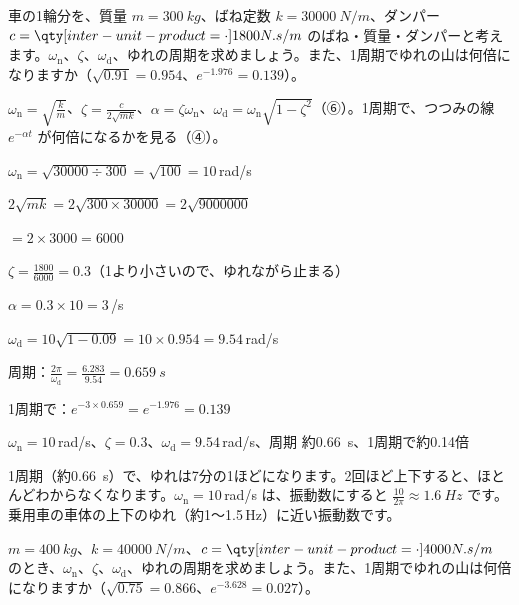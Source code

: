 \begin{reidai}[車の1輪分のゆれ]
車の1輪分を、質量 $m=\qty{300}{kg}$、ばね定数 $k=\qty{30000}{N/m}$、ダンパー $c=\bkvimNsm{1800}$ のばね・質量・ダンパーと考えます。$\omega_{\mathrm n}$、$\zeta$、$\omega_{\mathrm d}$、ゆれの周期を求めましょう。また、1周期でゆれの山は何倍になりますか（$\sqrt{0.91}=0.954$、$e^{-1.976}=0.139$）。\par
\kangaekata $\omega_{\mathrm n}=\sqrt{\frac km}$、$\zeta=\frac{c}{2\sqrt{mk}}$、$\alpha=\zeta\omega_{\mathrm n}$、$\omega_{\mathrm d}=\omega_{\mathrm n}\sqrt{1-\zeta^2}$（⑥）。1周期で、つつみの線 $e^{-\alpha t}$ が何倍になるかを見る（④）。\par
\shiki $\omega_{\mathrm n}=\sqrt{\num{30000}\div300}=\sqrt{100}=10$\,rad/s\par
\bkvimq $2\sqrt{mk}=2\sqrt{300\times\num{30000}}=2\sqrt{\num{9000000}}$\par
\bkvimq {}${}=2\times3000=6000$\par
\bkvimq $\zeta=\frac{1800}{6000}=0.3$（1より小さいので、ゆれながら止まる）\par
\bkvimq $\alpha=0.3\times10=3$\,/s\par
\bkvimq $\omega_{\mathrm d}=10\sqrt{1-0.09}=10\times0.954=9.54$\,rad/s\par
\bkvimq 周期：$\frac{2\pi}{\omega_{\mathrm d}}=\frac{6.283}{9.54}=\qty{0.659}{s}$\par
\bkvimq 1周期で：$e^{-3\times0.659}=e^{-1.976}=0.139$\par
\kotae $\omega_{\mathrm n}=10$\,rad/s、$\zeta=0.3$、$\omega_{\mathrm d}=9.54$\,rad/s、周期 約\qty{0.66}{s}、1周期で約0.14倍
\end{reidai}
1周期（約\qty{0.66}{s}）で、ゆれは7分の1ほどになります。2回ほど上下すると、ほとんどわからなくなります。$\omega_{\mathrm n}=10$\,rad/s は、振動数にすると $\frac{10}{2\pi}\approx\qty{1.6}{Hz}$ です。乗用車の車体の上下のゆれ（約1〜1.5\,Hz）に近い振動数です。

\begin{jibun}
$m=\qty{400}{kg}$、$k=\qty{40000}{N/m}$、$c=\bkvimNsm{4000}$ のとき、$\omega_{\mathrm n}$、$\zeta$、$\omega_{\mathrm d}$、ゆれの周期を求めましょう。また、1周期でゆれの山は何倍になりますか（$\sqrt{0.75}=0.866$、$e^{-3.628}=0.027$）。
\end{jibun}

